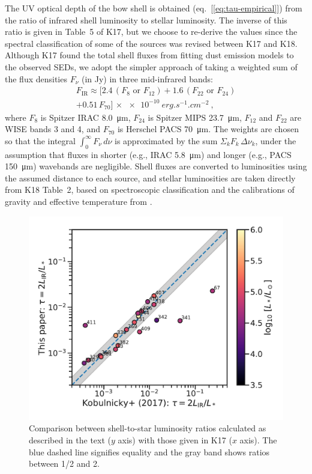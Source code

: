 The UV optical depth of the bow shell is obtained
(eq.~[\ref{eq:tau-empirical}]) from the ratio of infrared shell
luminosity to stellar luminosity.  The inverse of this ratio is given
in Table~5 of K17, but we choose to re-derive the values since the
spectral classification of some of the sources was revised between K17
and K18.  Although K17 found the total shell fluxes from fitting dust
emission models to the observed SEDs, we adopt the simpler approach of
taking a weighted sum of the flux densities \(F_\nu\) (in \si{Jy}) in
three mid-infrared bands:
\begin{multline}
  \label{eq:total-ir-flux}
  F_{\text{IR}}  \approx \bigl[  2.4\,(F_8 \text{ or } F_{12})
    + 1.6\,(F_{22} \text{ or } F_{24})  \\
  + 0.51\,F_{70}\bigr]
  \,\times \SI{e-10}{erg.s^{-1}.cm^{-2}} \ ,
\end{multline}
where \(F_8\) is Spitzer IRAC \SI{8.0}{\um}, \(F_{24}\) is Spitzer
MIPS \SI{23.7}{\um}, \(F_{12}\) and \(F_{22}\) are WISE bands 3 and 4,
and \(F_{70}\) is Herschel PACS \SI{70}{\um}.  The weights are chosen
so that the integral \(\int_0^\infty F_\nu \,d\nu\) is approximated by the sum
\(\Sigma_k F_k\, \Delta\nu_k\), under the assumption that fluxes in shorter (e.g.,
IRAC \SI{5.8}{\um}) and longer (e.g., PACS \SI{150}{\um}) wavebands
are negligible.  Shell fluxes are converted to luminosities using the
assumed distance to each source, and stellar luminosities are taken
directly from K18 Table~2, based on spectroscopic classification and
the calibrations of gravity and effective temperature from
\citet{Martins:2005a}.  

\begin{figure}
  \centering
  \includegraphics[width=\linewidth]{figs/K17-tau-comparison}
  \caption{Comparison between shell-to-star luminosity ratios
    calculated as described in the text (\(y\) axis) with those given
    in K17 (\(x\) axis).  The blue dashed line signifies equality and
    the gray band shows ratios between 1/2 and 2.}
  \label{fig:k17-k18-comparison}
\end{figure}

